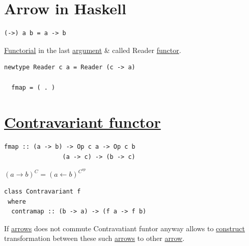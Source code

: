 \documentclass[a4paper,14pt,oneside]{book}
\begin{document}
\chapter{\label{orgdaa6eb4}Arrow in Haskell}
\label{sec:orgf3377d7}

\begin{verbatim}
(->) a b = a -> b
\end{verbatim}
\hyperref[orgdf5080a]{Functorial} in the last \hyperref[orgf60bb90]{argument} \& called Reader \hyperref[org09f34e9]{functor}.

\begin{verbatim}
newtype Reader c a = Reader (c -> a)

  fmap = ( . )
\end{verbatim}

\chapter{\hyperref[org30165b6]{Contravariant functor}}
\label{sec:org6290c25}

\begin{verbatim}
fmap :: (a -> b) -> Op c a -> Op c b
                (a -> c) -> (b -> c)
\end{verbatim}


\((a \to b)^{C} = (a \leftarrow b)^{C^{op}}\)

\begin{verbatim}
class Contravariant f
 where
  contramap :: (b -> a) -> (f a -> f b)
\end{verbatim}


If \hyperref[org5e8ff7a]{arrows} does not commute Contravatiant funtor anyway allows to \hyperref[org1d78fd2]{construct} transformation between these such \hyperref[org5e8ff7a]{arrows} to other \hyperref[org4ba8fc5]{arrow}.
\end{document}
